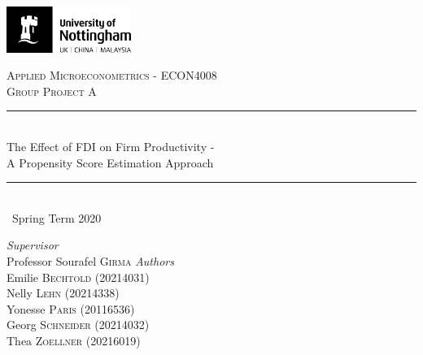 \documentclass[a4paper,11pt]{scrartcl}
\newcommand{\sectionnumbering}[1]{%
  \setcounter{section}{0}%
   \renewcommand{\thesection}{\csname #1\endcsname{section}}}
\begin{document}
	\begin{titlepage}
		\newcommand{\HRule}{\rule{\linewidth}{0.5mm}}
		
	\vfill\vfill
	\includegraphics[height=1.5cm]{UoN_Logo}\\[1cm] 

	\vfill\vfill
	\center			
 
	\textsc{\Large Applied Microeconometrics - ECON4008}\\[0.5cm] 	
	\textsc{\large Group Project A}\\[0.5cm] 
	
	\HRule\\[0.4cm]
	{\huge The Effect of FDI on Firm Productivity - \\[0.4cm] A Propensity Score Estimation Approach}\\[0.4cm] 
	\HRule\\[0.4cm]
	
	{\large\ Spring Term 2020} 	
	\vfill\vfill\vfill\vfill	
	
\begin{flushleft}
			\large
			\textit{Supervisor}\\
			Professor Sourafel \textsc{Girma} 
			\vfill\vfill 
			\textit{Authors}\\
			Emilie \textsc{Bechtold} (20214031)\\
			Nelly  \textsc{Lehn} (20214338)\\
			Yonesse \textsc{Paris} (20116536)\\
			Georg  \textsc{Schneider} (20214032)\\
			Thea  \textsc{Zoellner} (20216019)
		\end{flushleft}
	\vfill 
	
\end{titlepage}


\sectionnumbering{Roman}
\tableofcontents

\newpage

\listoftables
\listoffigures
\newpage

\sectionnumbering{arabic}
\end{document}
